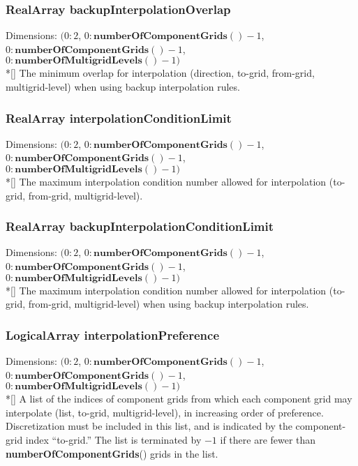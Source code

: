 \documentclass{article}
\begin{document}
  \subsubsection{RealArray backupInterpolationOverlap}
  \label{CompositeGrid::backupInterpolationOverlap}
    Dimensions: $(0\colon2$, $0\colon\textbf{numberOfComponentGrids}()-1$, $0\colon\textbf{numberOfComponentGrids}()-1$, $0\colon\textbf{numberOfMultigridLevels}()-1)$ \\*[\parskip]
    The minimum overlap for interpolation (direction, to-grid, from-grid, multigrid-level) when using backup interpolation rules.

  \subsubsection{RealArray interpolationConditionLimit}
  \label{CompositeGrid::interpolationConditionLimit}
    Dimensions: $(0\colon2$, $0\colon\textbf{numberOfComponentGrids}()-1$, $0\colon\textbf{numberOfComponentGrids}()-1$, $0\colon\textbf{numberOfMultigridLevels}()-1)$ \\*[\parskip]
    The maximum interpolation condition number allowed for interpolation (to-grid, from-grid, multigrid-level).

  \subsubsection{RealArray backupInterpolationConditionLimit}
  \label{CompositeGrid::backupInterpolationConditionLimit}
    Dimensions: $(0\colon2$, $0\colon\textbf{numberOfComponentGrids}()-1$, $0\colon\textbf{numberOfComponentGrids}()-1$, $0\colon\textbf{numberOfMultigridLevels}()-1)$ \\*[\parskip]
    The maximum interpolation condition number allowed for interpolation (to-grid, from-grid, multigrid-level) when using backup interpolation rules.

  \subsubsection{LogicalArray interpolationPreference}
  \label{CompositeGrid::interpolationPreference}
    Dimensions: $(0\colon2$, $0\colon\textbf{numberOfComponentGrids}()-1$, $0\colon\textbf{numberOfComponentGrids}()-1$, $0\colon\textbf{numberOfMultigridLevels}()-1)$ \\*[\parskip]
    A list of the indices of component grids from which each component grid may interpolate (list, to-grid, multigrid-level), in increasing order of preference.
    Discretization must be included in this list, and is indicated by the component-grid index ``to-grid.''
    The list is terminated by $-1$ if there are fewer than \textbf{numberOfComponentGrids}() grids in the list.
\end{document}
